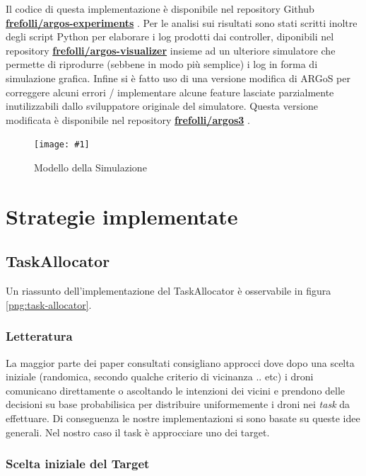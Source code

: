 \documentclass[a4paper,11pt,oneside, table]{article}
\newcommand{\putimage}[4] {
	\begin{figure}[H]
	    \centering
	    \texttt{[image: \#1]}
	    \caption{#2}\label{#3}
	\end{figure}
}
\begin{document}
Il codice di questa implementazione \`e disponibile nel repository Github \textbf{\href{http://github.com/frefolli/argos-experiments}{frefolli/argos-experiments}} \cite{RF:AE}.
Per le analisi sui risultati sono stati scritti inoltre degli script Python per elaborare i log prodotti dai controller, diponibili nel repository \textbf{\href{http://github.com/frefolli/argos-visualizer}{frefolli/argos-visualizer}} \cite{RF:AV} insieme ad un ulteriore simulatore che permette di riprodurre (sebbene in modo pi\`u semplice) i log in forma di simulazione grafica.
Infine si \`e fatto uso di una versione modifica di ARGoS per correggere alcuni errori / implementare alcune feature lasciate parzialmente inutilizzabili dallo sviluppatore originale del simulatore. Questa versione modificata \`e disponibile nel repository \textbf{\href{http://github.com/frefolli/argos3}{frefolli/argos3}} \cite{RF:A3}.

\putimage{images/simulation-model.png}{Modello della Simulazione}{png:simulation-model}{0.99}

\section{Strategie implementate}

\subsection{TaskAllocator}

Un riassunto dell'implementazione del TaskAllocator \`e osservabile in figura \ref{png:task-allocator}.

\subsubsection{Letteratura}

La maggior parte dei paper consultati consigliano approcci dove dopo una scelta iniziale (randomica, secondo qualche criterio di vicinanza .. etc) i droni comunicano direttamente o ascoltando le intenzioni dei vicini e prendono delle decisioni su base probabilisica per distribuire uniformemente i droni nei \textit{task} da effettuare.
Di conseguenza le nostre implementazioni si sono basate su queste idee generali. Nel nostro caso il task \`e approcciare uno dei target.

\subsubsection{Scelta iniziale del Target}
\end{document}
